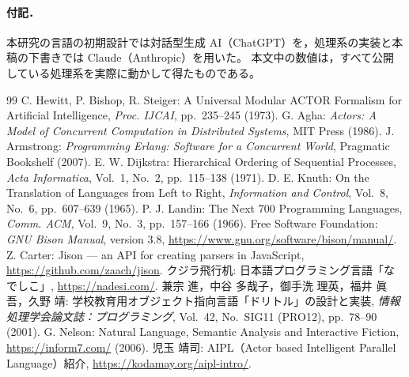 \documentclass[a4paper,10pt]{ltjsarticle}
\begin{document}
\paragraph{付記．}
本研究の言語の初期設計では対話型生成 AI（ChatGPT）を，処理系の実装と本稿の下書きでは Claude（Anthropic）を用いた。
本文中の数値は，すべて公開している処理系を実際に動かして得たものである。

\begin{thebibliography}{99}\small
{} C. Hewitt, P. Bishop, R. Steiger: A Universal Modular ACTOR Formalism for Artificial Intelligence, \textit{Proc. IJCAI}, pp.~235--245 (1973).
 G. Agha: \textit{Actors: A Model of Concurrent Computation in Distributed Systems}, MIT Press (1986).
 J. Armstrong: \textit{Programming Erlang: Software for a Concurrent World}, Pragmatic Bookshelf (2007).
 E. W. Dijkstra: Hierarchical Ordering of Sequential Processes, \textit{Acta Informatica}, Vol.~1, No.~2, pp.~115--138 (1971).
 D. E. Knuth: On the Translation of Languages from Left to Right, \textit{Information and Control}, Vol.~8, No.~6, pp.~607--639 (1965).
 P. J. Landin: The Next 700 Programming Languages, \textit{Comm. ACM}, Vol.~9, No.~3, pp.~157--166 (1966).
 Free Software Foundation: \textit{GNU Bison Manual}, version 3.8, \url{https://www.gnu.org/software/bison/manual/}.
 Z. Carter: Jison --- an API for creating parsers in JavaScript, \url{https://github.com/zaach/jison}.
 クジラ飛行机: 日本語プログラミング言語「なでしこ」, \url{https://nadesi.com/}.
 兼宗 進，中谷 多哉子，御手洗 理英，福井 眞吾，久野 靖: 学校教育用オブジェクト指向言語「ドリトル」の設計と実装, \textit{情報処理学会論文誌：プログラミング}, Vol.~42, No.~SIG11 (PRO12), pp.~78--90 (2001).
 G. Nelson: Natural Language, Semantic Analysis and Interactive Fiction, \url{https://inform7.com/} (2006).
 児玉 靖司: AIPL（Actor based Intelligent Parallel Language）紹介, \url{https://kodamay.org/aipl-intro/}.
\end{thebibliography}
\end{document}
